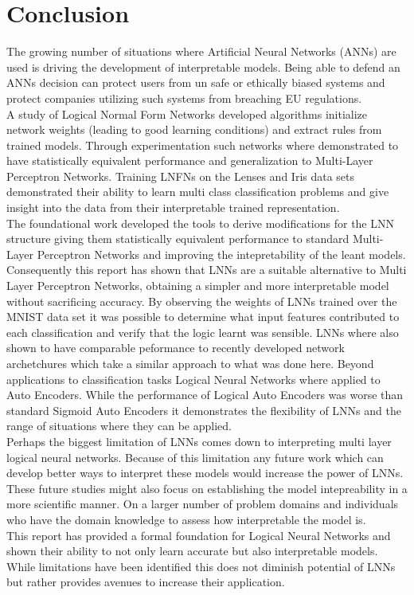 \chapter{Conclusion}\label{C:con}
The growing number of situations where Artificial Neural Networks (ANNs) are used is driving the development of interpretable models. Being able to defend an ANNs decision can protect users from un safe or ethically biased systems and protect companies utilizing such systems from breaching EU regulations.\\

A study of Logical Normal Form Networks developed algorithms initialize network weights (leading to good learning conditions) and extract rules from trained models. Through experimentation such networks where demonstrated to have statistically equivalent performance and generalization to Multi-Layer Perceptron Networks. Training LNFNs on the Lenses and Iris data sets demonstrated their ability to learn multi class classification problems and give insight into the data from their interpretable trained representation.\\

The foundational work developed the tools to derive modifications for the LNN structure giving them statistically equivalent performance to standard Multi-Layer Perceptron Networks and improving the intepretability of the leant models. Consequently this report has shown that LNNs are a suitable alternative to Multi Layer Perceptron Networks, obtaining a simpler and more interpretable model without sacrificing accuracy. By observing the weights of LNNs trained over the MNIST data set it was possible to determine what input features contributed to each classification and verify that the logic learnt was sensible. LNNs where also shown to have comparable peformance to recently developed network archetchures which take a similar approach to what was done here. Beyond applications to classification tasks Logical Neural Networks where applied to Auto Encoders. While the performance of Logical Auto Encoders was worse than standard Sigmoid Auto Encoders it demonstrates the flexibility of LNNs and the range of situations where they can be applied.\\

Perhaps the biggest limitation of LNNs comes down to interpreting multi layer logical neural networks. Because of this limitation any future work which can develop better ways to interpret these models would increase the power of LNNs. These future studies might also focus on establishing the model intepreability in a more scientific manner. On a larger number of problem domains and individuals who have the domain knowledge to assess how interpretable the model is.\\

This report has provided a formal foundation for Logical Neural Networks and shown their ability to not only learn accurate but also interpretable models. While limitations have been identified this does not diminish potential of LNNs but rather provides avenues to increase their application.




